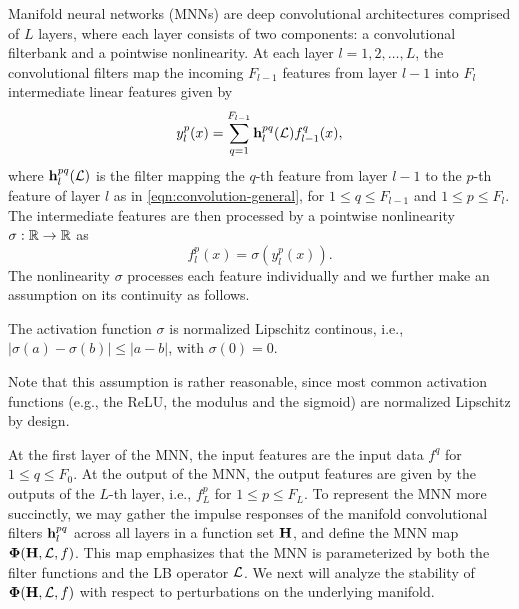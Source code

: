
Manifold neural networks (MNNs) are deep convolutional architectures comprised of $L$ layers, where each layer consists of two components: a convolutional filterbank and a pointwise nonlinearity. 
At each layer $l=1,2,\hdots, L$, the convolutional filters map the incoming $F_{l-1}$ features from layer $l-1$ into $F_l$ intermediate linear features given by
\begin{equation}\label{eqn:mnn}
y_l^p(x) =  \sum_{q=1}^{F_{l-1}} {\mathbf h}_l^{pq}({\mathcal L}) f_{l-1}^q(x),
\end{equation}
where ${\mathbf h}_l^{pq}({\mathcal L})$ is the filter mapping the $q$-th feature from layer $l-1$ to the $p$-th feature of layer $l$ as in \eqref{eqn:convolution-general}, for $1\leq q\leq F_{l-1}$ and $1\leq p\leq F_{l}$. The intermediate features are then processed by a pointwise nonlinearity $\sigma: {\mathbb R}\rightarrow {\mathbb R}$ as
\begin{equation}\label{eqn:mnn}
f_l^p(x) = \sigma\left(y_l^p(x) \right).
\end{equation}
The nonlinearity $\sigma$ processes each feature individually and we further make an assumption on its continuity as follows. 

\begin{assumption}\label{ass:activation}
 The activation function $\sigma$ is normalized Lipschitz continous, i.e., $|\sigma(a)-\sigma(b)|\leq |a-b|$, with $\sigma(0)=0$.
\end{assumption}
 
Note that this assumption is rather reasonable, since most common activation functions (e.g., the ReLU, the modulus and the sigmoid) are normalized Lipschitz by design.

At the first layer of the MNN, the input features are the input data $f^q$ for $1\leq q\leq F_0$. At the output of the MNN, the output features are given by the outputs of the $L$-th layer, i.e., $f_L^p$ for $1 \leq p \leq F_L$. To represent the MNN more succinctly, we may gather the impulse responses of the manifold convolutional filters ${\mathbf h}_l^{pq}$ across all layers in a function set ${\mathbf H}$, and define the MNN map $\boldsymbol{\Phi}({\mathbf H},{\mathcal L}, f)$. This map emphasizes that the MNN is parameterized by both the filter functions and the LB operator ${\mathcal L}$. We next will analyze the stability of $\boldsymbol{\Phi}({\mathbf H},{\mathcal L},f)$ with respect to perturbations on the underlying manifold.

